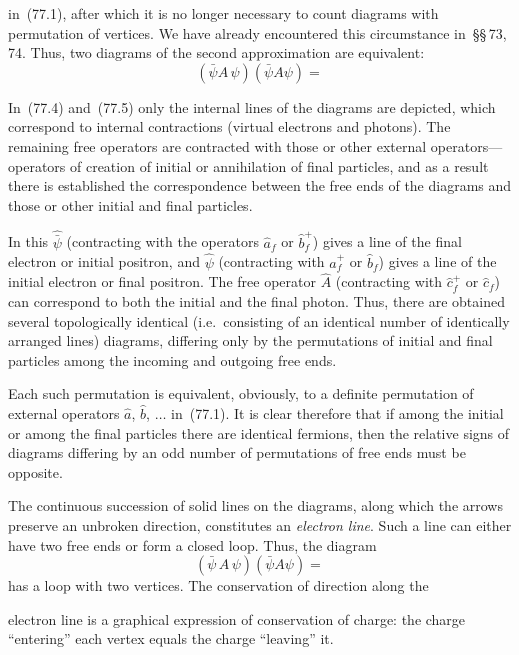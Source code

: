 in~(77.1), after which it is no longer necessary to count diagrams with permutation of vertices. We have already encountered this circumstance in~\S\S\,73, 74. Thus, two diagrams of the second approximation are equivalent:
\begin{equation}
(\bar{\psi}A\,\psi)(\bar{\psi}A\psi) = %
\tag{77.5}
\end{equation}

In~(77.4) and~(77.5) only the internal lines of the diagrams are depicted, which correspond to internal contractions (virtual electrons and photons). The remaining free operators are contracted with those or other external operators---operators of creation of initial or annihilation of final particles, and as a result there is established the correspondence between the free ends of the diagrams and those or other initial and final particles.

In this $\hat{\bar{\psi}}$ (contracting with the operators $\hat{a}_f$ or $\hat{b}_f^+$) gives a line of the final electron or initial positron, and $\hat{\psi}$ (contracting with $\hat{a}_f^+$ or $\hat{b}_f$) gives a line of the initial electron or final positron. The free operator $\hat{A}$ (contracting with $\hat{c}_f^+$ or $\hat{c}_f$) can correspond to both the initial and the final photon. Thus, there are obtained several topologically identical (i.e.\ consisting of an identical number of identically arranged lines) diagrams, differing only by the permutations of initial and final particles among the incoming and outgoing free ends.

Each such permutation is equivalent, obviously, to a definite permutation of external operators $\hat{a}$, $\hat{b}$, $\ldots$ in~(77.1). It is clear therefore that if among the initial or among the final particles there are identical fermions, then the relative signs of diagrams differing by an odd number of permutations of free ends must be opposite.

The continuous succession of solid lines on the diagrams, along which the arrows preserve an unbroken direction, constitutes an \textit{electron line}. Such a line can either have two free ends or form a closed loop. Thus, the diagram
\[
(\bar{\psi}\,A\,\psi)(\bar{\psi}A\psi) =
\]
has a loop with two vertices. The conservation of direction along the

electron line is a graphical expression of conservation of charge: the charge ``entering'' each vertex equals the charge ``leaving'' it.


